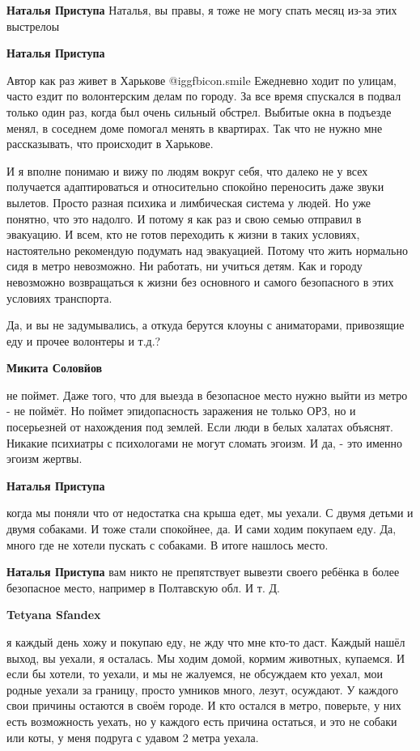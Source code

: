 \begin{itemize}
\begin{itemize} %
\textbf{Наталья Приступа} Наталья, вы правы, я тоже не могу спать месяц из-за этих выстрелоы

\textbf{Наталья Приступа} 

Автор как раз живет в Харькове  @igg{fbicon.smile}  Ежедневно ходит по улицам, часто ездит по
волонтерским делам по городу. За все время спускался в подвал только один раз,
когда был очень сильный обстрел. Выбитые окна в подъезде менял, в соседнем доме
помогал менять в квартирах. Так что не нужно мне рассказывать, что происходит в
Харькове.

И я вполне понимаю и вижу по людям вокруг себя, что далеко не у всех получается
адаптироваться и относительно спокойно переносить даже звуки вылетов. Просто
разная психика и лимбическая система у людей. Но уже понятно, что это надолго.
И потому я как раз и свою семью отправил в эвакуацию. И всем, кто не готов
переходить к жизни в таких условиях, настоятельно рекомендую подумать над
эвакуацией. Потому что жить нормально сидя в метро невозможно. Ни работать, ни
учиться детям. Как и городу невозможно возвращаться к жизни без основного и
самого безопасного в этих условиях транспорта.

Да, и вы не задумывались, а откуда берутся клоуны с аниматорами, привозящие еду
и прочее волонтеры и т.д.?

\textbf{Микита Соловйов} 

не поймет. Даже того, что для выезда в безопасное место нужно выйти из метро -
не поймёт. Но поймет эпидопасность заражения не только ОРЗ, но и посерьезней от
нахождения под землей. Если люди в белых халатах объяснят. Никакие психиатры с
психологами не могут сломать эгоизм. И да, - это именно эгоизм жертвы.

\textbf{Наталья Приступа} 

когда мы поняли что от недостатка сна крыша едет, мы уехали. С двумя детьми и
двумя собаками. И тоже стали спокойнее, да. И сами ходим покупаем еду. Да,
много где не хотели пускать с собаками. В итоге нашлось место.

\textbf{Наталья Приступа} вам никто не препятствует вывезти своего ребёнка в более безопасное место, например в Полтавскую обл. И т. Д.

\textbf{Tetyana Sfandex} 

я каждый день хожу и покупаю еду, не жду что мне кто-то даст. Каждый нашёл
выход, вы уехали, я осталась. Мы ходим домой, кормим животных, купаемся. И если
бы хотели, то уехали, и мы не жалуемся, не обсуждаем кто уехал, мои родные
уехали за границу, просто умников много, лезут, осуждают. У каждого свои
причины остаются в своём городе. И кто остался в метро, поверьте, у них есть
возможность уехать, но у каждого есть причина остаться, и это не собаки или
коты, у меня подруга с удавом 2 метра уехала.


\end{itemize}
\end{itemize}
